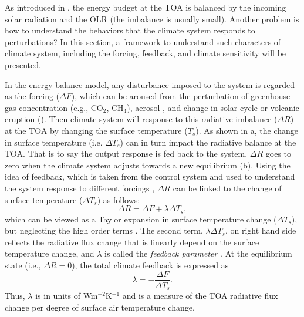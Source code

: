  As introduced in , the energy budget at the TOA is balanced by the incoming solar radiation and the OLR (the imbalance is usually small). Another problem is how to understand the behaviors that the climate system responds to perturbations? In this section, a framework to understand such characters of climate system, including the forcing, feedback, and climate sensitivity will be presented.
 
 In the energy balance model, any disturbance imposed to the system is regarded as the forcing ($\Delta F$), which can be aroused from the perturbation of greenhouse gas concentration (e.g., CO$_2$, CH$_4$), aerosol \citep{Ramanathan2001aerosols}, and change in solar cycle \citep{Frohlich2004solar} or volcanic eruption (). Then climate system will response to this radiative imbalance ($\Delta R$) at the TOA  by changing the surface temperature ($T_s$). As shown in a, the change in surface temperature (i.e. $\Delta T_s$) can in turn impact the radiative balance at the TOA. That is to say the output response is fed back to the system. $\Delta R$ goes to zero when the climate system adjusts towards a new equilibrium (b). Using the idea of feedback, which is taken from the control system and used to understand the system response to different forcings \citep{Stephens2005cloud},
$\Delta R$ can be linked to the change of surface temperature ($\Delta T_s$) as follows:
\begin{equation}
    \Delta R = \Delta F + \lambda \Delta T_s,
    \label{eq:imbalance_forcing_lambda1}
\end{equation}
which can be viewed as a Taylor expansion in surface temperature change ($\Delta T_s$), but neglecting the high order terms \citep{Feldl2013a}. The second term, $\lambda \Delta T_s$, on right hand side reflects the radiative flux change that is linearly depend on the surface temperature change, and $\lambda$ is called the \textit{feedback parameter} \citep{Gregory2004}. At the equilibrium state (i.e., $\Delta R=0$), the total climate feedback is expressed as 
\begin{equation}
    \lambda = -\frac{\Delta F}{\Delta T_s}.
\end{equation}
Thus, $\lambda$ is in units of Wm$^{-2}$K$^{-1}$ and is a measure of the TOA radiative flux change per degree of surface air temperature change. 

